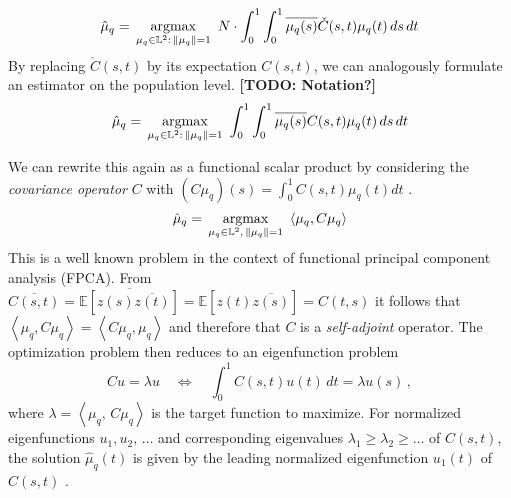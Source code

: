 $$ \hat\mu_q = \, \operatorname*{argmax}_{\mu_q \in \mathbb{L}^2:\,\lVert\mu_q\rVert = 1}\,\,
    N\cdot\int_0^1 \int_0^1 \overline{\mu_q (s)} \check C(s,t) \mu_q(t) \,ds\,dt $$
By replacing $\check C(s,t)$ by its expectation $C(s,t)$, we can analogously formulate an estimator on the population level.
\textbf{[TODO: Notation?]}
$$ \hat\mu_q = \, \operatorname*{argmax}_{\mu_q \in \mathbb{L}^2:\,\lVert\mu_q\rVert = 1}\,\,
    \int_0^1 \int_0^1 \overline{\mu_q (s)} C(s,t) \mu_q(t) \,ds\,dt $$

We can rewrite this again as a functional scalar product by considering the \emph{covariance operator} $C$ with $(C\mu_q)(s) = \int_0^1 C(s,t) \mu_q(t) dt$ \parencite[see][153]{RamsaySilverman2005}.
\begin{equation}
  \label{eq:quadr_opt}
  \hat\mu_q = \, \operatorname*{argmax}_{\mu_q \in \mathbb{L}^2,\,\lVert\mu_q\rVert = 1}\,\,
    \left\langle \mu_q, C\mu_q \right\rangle
\end{equation}
This is a well known problem in the context of functional principal component analysis (FPCA).
From $\overline{C(s,t)} = \overline{\mathbb{E}[z(s)\overline{z(t)}]} = \mathbb{E}[z(t)\overline{z(s)}] = C(t,s)$ it follows that $\left\langle \mu_q, C \mu_q \right\rangle = \left\langle C \mu_q, \mu_q \right\rangle$ and therefore that $C$ is a \emph{self-adjoint} operator.
The optimization problem then reduces to an eigenfunction problem 
\begin{equation}
  \label{eq:funceig}
  Cu = \lambda u \quad \Leftrightarrow \quad \int_0^1 C(s, t) u(t)\, dt = \lambda u(s)\,,
\end{equation}
where $\lambda = \left\langle \mu_q,\, C \mu_q \right\rangle$ is the target function to maximize.
For normalized eigenfunctions $u_1, u_2,\,\dots$ and corresponding eigenvalues $\lambda_1 \geq \lambda_2 \geq \dots$ of $C(s,t)$, the solution $\hat\mu_q(t)$ is given by the leading normalized eigenfunction $u_1(t)$ of $C(s,t)$ \parencite[see][153,397]{RamsaySilverman2005}.

